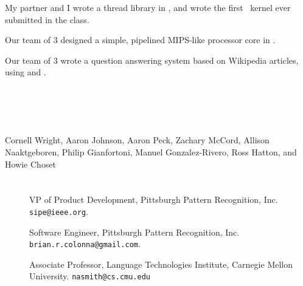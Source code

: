 My partner and I wrote a thread library in , and wrote the first \kw{\Cplusplus}\ 
kernel
ever submitted in the class.


Our team of 3 designed a simple, pipelined MIPS-like processor core in
\kw{Verilog}.


Our team of 3 wrote a question answering system based on Wikipedia articles,
using \kw{SML} and \kw{Perl}.




\begin{formatb}
  \\
  \body\\
\end{formatb}

\section{}


Cornell Wright, Aaron Johnson, Aaron Peck, Zachary McCord, Allison Naaktgeboren, Philip Gianfortoni, Manuel Gonzalez-Rivero, Ross Hatton, and Howie Choset

\section{}

\begin{description}
\item[] VP of Product Development, Pittsburgh
Pattern Recognition, Inc.\\
\texttt{sipe@ieee.org}. 
\item[] Software Engineer, Pittsburgh Pattern
Recognition, Inc.\\
\texttt{brian.r.colonna@gmail.com}. 
\item[] Associate Professor, Language Technologies Institute, Carnegie
Mellon University. \texttt{nasmith@cs.cmu.edu}
\end{description}


